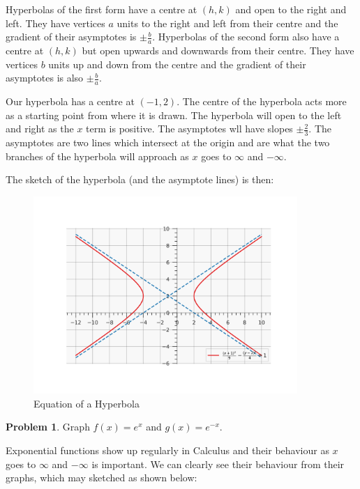 \documentclass[12pt]{article}
\theoremstyle{definition}
\newtheorem{problem}{Problem}
\begin{document}
Hyperbolas of the first form have a centre at $(h,k)$ and open to the right and left.
They have vertices $a$ units to the right and left from their centre and the gradient of their asymptotes is $\pm\frac{b}{a}$.
Hyperbolas of the second form also have a centre at $(h,k)$ but open upwards and downwards from their centre.
They have vertices $b$ units up and down from the centre and the gradient of their asymptotes is also $\pm\frac{b}{a}$.

Our hyperbola has a centre at $(-1, 2)$.
The centre of the hyperbola acts more as a starting point from where it is drawn.
The hyperbola will open to the left and right as the $x$ term is positive.
The asymptotes wll have slopes $\pm\frac{2}{3}$.
The asymptotes are two lines which intersect at the origin and are what the two branches of the hyperbola will approach as $x$ goes to $\infty$ and $-\infty$.

The sketch of the hyperbola (and the asymptote lines) is then:

\begin{figure}[H]
    \centering
    \includegraphics[width=10cm, keepaspectratio]{graph_7.png}
    \caption{Equation of a Hyperbola}
    \label{fig:fig7}
\end{figure}

\begin{problem}
Graph $f(x)=e^x$ and $g(x)=e^{-x}$.
\end{problem}

Exponential functions show up regularly in Calculus and their behaviour as $x$ goes to $\infty$ and $-\infty$ is important.
We can clearly see their behaviour from their graphs, which may sketched as shown below:
\end{document}

